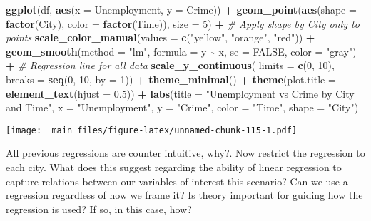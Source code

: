 \documentclass[
]{book}
\newenvironment{Shaded}{\begin{snugshade}}{\end{snugshade}}
\newcommand{\AttributeTok}[1]{\textcolor[rgb]{0.13,0.29,0.53}{#1}}
\newcommand{\CommentTok}[1]{\textcolor[rgb]{0.56,0.35,0.01}{\textit{#1}}}
\newcommand{\ConstantTok}[1]{\textcolor[rgb]{0.56,0.35,0.01}{#1}}
\newcommand{\DecValTok}[1]{\textcolor[rgb]{0.00,0.00,0.81}{#1}}
\newcommand{\FloatTok}[1]{\textcolor[rgb]{0.00,0.00,0.81}{#1}}
\newcommand{\FunctionTok}[1]{\textcolor[rgb]{0.13,0.29,0.53}{\textbf{#1}}}
\newcommand{\NormalTok}[1]{#1}
\newcommand{\SpecialCharTok}[1]{\textcolor[rgb]{0.81,0.36,0.00}{\textbf{#1}}}
\newcommand{\StringTok}[1]{\textcolor[rgb]{0.31,0.60,0.02}{#1}}
\begin{document}
\begin{Shaded}
\begin{Highlighting}[]
\FunctionTok{ggplot}\NormalTok{(df, }\FunctionTok{aes}\NormalTok{(}\AttributeTok{x =}\NormalTok{ Unemployment, }\AttributeTok{y =}\NormalTok{ Crime)) }\SpecialCharTok{+}
  \FunctionTok{geom\_point}\NormalTok{(}\FunctionTok{aes}\NormalTok{(}\AttributeTok{shape =} \FunctionTok{factor}\NormalTok{(City), }\AttributeTok{color =} \FunctionTok{factor}\NormalTok{(Time)), }\AttributeTok{size =} \DecValTok{5}\NormalTok{) }\SpecialCharTok{+}  \CommentTok{\# Apply shape by City only to points}
  \FunctionTok{scale\_color\_manual}\NormalTok{(}\AttributeTok{values =} \FunctionTok{c}\NormalTok{(}\StringTok{"yellow"}\NormalTok{, }\StringTok{"orange"}\NormalTok{, }\StringTok{"red"}\NormalTok{)) }\SpecialCharTok{+}
  \FunctionTok{geom\_smooth}\NormalTok{(}\AttributeTok{method =} \StringTok{"lm"}\NormalTok{, }\AttributeTok{formula =}\NormalTok{ y }\SpecialCharTok{\textasciitilde{}}\NormalTok{ x, }\AttributeTok{se =} \ConstantTok{FALSE}\NormalTok{, }\AttributeTok{color =} \StringTok{"gray"}\NormalTok{) }\SpecialCharTok{+}  \CommentTok{\# Regression line for all data}
  \FunctionTok{scale\_y\_continuous}\NormalTok{(}
    \AttributeTok{limits =} \FunctionTok{c}\NormalTok{(}\DecValTok{0}\NormalTok{, }\DecValTok{10}\NormalTok{),}
    \AttributeTok{breaks =} \FunctionTok{seq}\NormalTok{(}\DecValTok{0}\NormalTok{, }\DecValTok{10}\NormalTok{, }\AttributeTok{by =} \DecValTok{1}\NormalTok{)) }\SpecialCharTok{+}
  \FunctionTok{theme\_minimal}\NormalTok{() }\SpecialCharTok{+}
  \FunctionTok{theme}\NormalTok{(}\AttributeTok{plot.title =} \FunctionTok{element\_text}\NormalTok{(}\AttributeTok{hjust =} \FloatTok{0.5}\NormalTok{)) }\SpecialCharTok{+}
  \FunctionTok{labs}\NormalTok{(}\AttributeTok{title =} \StringTok{"Unemployment vs Crime by City and Time"}\NormalTok{,}
       \AttributeTok{x =} \StringTok{"Unemployment"}\NormalTok{,}
       \AttributeTok{y =} \StringTok{"Crime"}\NormalTok{,}
       \AttributeTok{color =} \StringTok{"Time"}\NormalTok{,}
       \AttributeTok{shape =} \StringTok{"City"}\NormalTok{)}
\end{Highlighting}
\end{Shaded}

\texttt{[image: \_main\_files/figure-latex/unnamed-chunk-115-1.pdf]}

All previous regressions are counter intuitive, why?. Now restrict the regression to each city. What does this suggest regarding the ability of linear regression to capture relations between our variables of interest this scenario? Can we use a regression regardless of how we frame it? Is theory important for guiding how the regression is used? If so, in this case, how?
\end{document}

